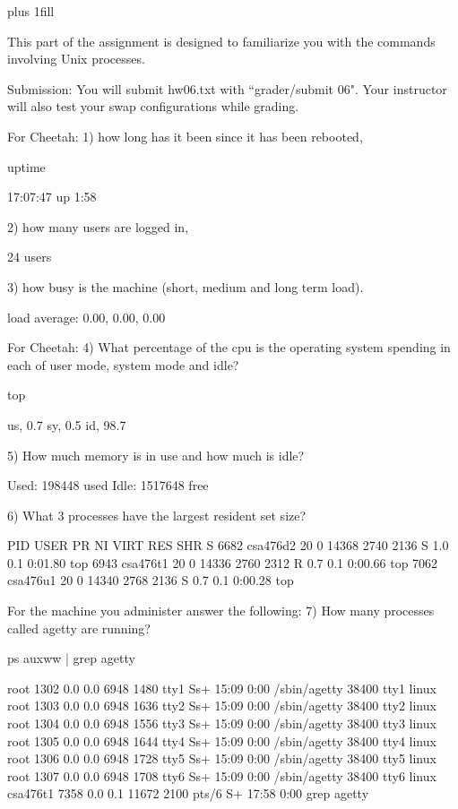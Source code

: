 
\rightskip=0pt plus 1fill

\parindent 0pt

This part of the assignment is designed to familiarize you with the
commands involving Unix processes.

Submission: You will submit hw06.txt with ``\tilde grader/submit 06".
Your instructor will also test your swap configurations while grading.

For Cheetah: 1) how long has it been since it has
been rebooted, 

uptime

17:07:47 up  1:58

2) how many users are logged in, 

24 users

3) how busy is the machine
(short, medium and long term load).

load average: 0.00, 0.00, 0.00

For Cheetah: 4) What percentage of the cpu is the operating system
spending in each of user mode, system mode and idle?

top

us,  0.7%
sy,  0.5%
id,  98.7%


5) How much memory is in use and
how much is idle?

Used: 198448 used
Idle: 1517648 free

6) What 3 processes have the largest resident set size?

PID USER      PR  NI    VIRT    RES    SHR S  %
 6682 csa476d2  20   0   14368   2740   2136 S   1.0  0.1   0:01.80 top        
 6943 csa476t1  20   0   14336   2760   2312 R   0.7  0.1   0:00.66 top        
 7062 csa476u1  20   0   14340   2768   2136 S   0.7  0.1   0:00.28 top

For the machine you administer answer the following:
7) How many processes called {\ltt{}agetty} are running?

ps auxww | grep agetty

root      1302  0.0  0.0   6948  1480 tty1     Ss+  15:09   0:00 /sbin/agetty
38400 tty1 linux
root      1303  0.0  0.0   6948  1636 tty2     Ss+  15:09   0:00 /sbin/agetty
38400 tty2 linux
root      1304  0.0  0.0   6948  1556 tty3     Ss+  15:09   0:00 /sbin/agetty
38400 tty3 linux
root      1305  0.0  0.0   6948  1644 tty4     Ss+  15:09   0:00 /sbin/agetty
38400 tty4 linux
root      1306  0.0  0.0   6948  1728 tty5     Ss+  15:09   0:00 /sbin/agetty
38400 tty5 linux
root      1307  0.0  0.0   6948  1708 tty6     Ss+  15:09   0:00 /sbin/agetty
38400 tty6 linux
csa476t1  7358  0.0  0.1  11672  2100 pts/6    S+   17:58   0:00 grep agetty

